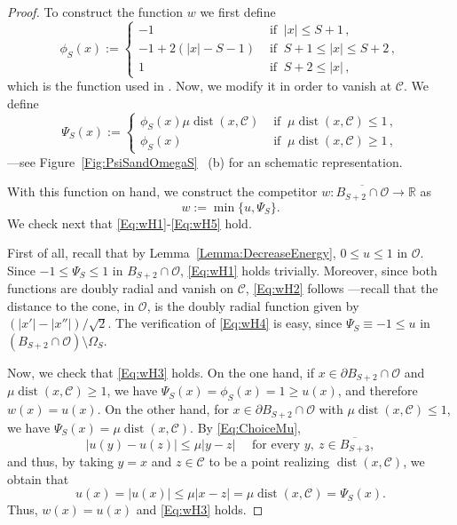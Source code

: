 \documentclass[12pt,reqno]{amsart}
\theoremstyle{definition}
\theoremstyle{remark}
\newcommand{\con}[1]{\mathbb{#1}}
\newcommand{\R}{\con{R}} %
\newcommand{\ccal}{\mathscr{C}}
\newcommand{\ocal}{\mathcal{O}}
\DeclareMathOperator{\dist}{dist}
\numberwithin{equation}{section}
\begin{document}
\begin{proof}
	To construct the function $w$ we first define
	\begin{equation}
		\label{Eq:DefOfPhiS}
		\phi_S(x):= 
		\begin{cases}
		-1 & \textrm{ if }  \ |x| \leq S+1\,, \\
		-1 + 2 (|x| - S-1)&  \textrm{ if } \ S+1 \leq |x| \leq S+2\,, \\
		1 & \textrm{ if }  \  S+2 \leq |x|\,,
		\end{cases}
	\end{equation}
	which is the function used in \cite{SavinValdinoci-EnergyEstimate}. Now, we modify it in order to vanish at $\ccal$. We define
	$$
	\Psi_S(x) :=
	\begin{cases}
	\phi_S (x) \mu\dist(x,\ccal) &  \textrm{ if }  \  \mu\dist(x,\ccal) \leq 1 \,, \\
	\phi_S (x) & \textrm{ if }  \  \mu\dist(x,\ccal) \geq 1\,,
	\end{cases}
	$$
	---see Figure~\ref{Fig:PsiSandOmegaS}~ (b) for an schematic representation.
	
	With this function on hand, we construct the competitor  $w:\overline{B_{S+2} \cap \ocal} \to \R$ as
	$$
	w:= \min \{u, \Psi_S\}.
	$$
	We check next that \eqref{Eq:wH1}-\eqref{Eq:wH5} hold.
	
	First of all, recall that by Lemma~\ref{Lemma:DecreaseEnergy}, $0\leq u \leq 1$ in $\ocal$. Since $-1\leq \Psi_S\leq 1$ in $B_{S+2} \cap \ocal$, \eqref{Eq:wH1} holds trivially. Moreover, since both functions are doubly radial and vanish on $\ccal$, \eqref{Eq:wH2} follows ---recall that the distance to the cone, in $\ocal$, is the doubly radial function given by $(|x'|-|x''|)/\sqrt{2}$. The verification of \eqref{Eq:wH4} is easy, since $\Psi_S \equiv-1 \leq u$ in $(B_{S+2}\cap \ocal)\setminus \Omega_S$.
	
	Now, we check that \eqref{Eq:wH3} holds. On the one hand, if $x\in \partial B_{S+2}\cap \ocal$ and $\mu\dist(x,\ccal) \geq 1$, we have $\Psi_S (x) = \phi_S(x) = 1 \geq u(x)$, and therefore $w(x) = u(x)$. On the other hand, for $x\in \partial B_{S+2}\cap \ocal$ with $\mu\dist(x,\ccal) \leq 1$, we have $\Psi_S (x) = \mu \dist (x,\ccal)$. By \eqref{Eq:ChoiceMu},
	$$ 
	|u(y) - u(z)|\leq \mu |y-z| \quad \text{ for every } y, \ z \in \overline{B_{S+3}},
	$$ 
	and thus, by taking $y=x$ and $z\in \ccal$ to be a point realizing $\dist(x,\ccal)$, we obtain that
	$$ 
	u(x) = |u(x)|\leq \mu |x-z|  = \mu \dist (x,\ccal) = \Psi_S (x).
	$$ 
	Thus, $w(x) = u(x)$ and \eqref{Eq:wH3} holds.
	

\end{proof}
\end{document}
